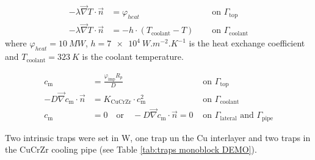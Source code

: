 \begin{subequations}
    \begin{align}
    -\lambda \vec{\nabla} T \cdot \vec{n} &=\varphi_{heat} \quad  &\text { on } \Gamma_\mathrm{top}\\
    -\lambda \vec{\nabla} T\cdot \vec{n} &= -h \cdot \left(T_\mathrm{coolant} - T\right)\quad &\text { on } \Gamma_\mathrm{coolant}
    \end{align}
    \label{eq: bc thermal DEMO monoblock}
\end{subequations}
where $\varphi_{heat}=\SI{10}{MW}$, $h=\SI{7e4}{W.m^{-2}.K^{-1}}$ is the heat exchange coefficient and $T_\mathrm{coolant} = \SI{323}{K}$ is the coolant temperature.

\begin{subequations}
    \begin{align}
    c_\mathrm{m} &=  \frac{\varphi_\mathrm{imp} R_p}{D} \quad &\text { on } \Gamma_\mathrm{top}\\
    -D \vec{\nabla} c_\mathrm{m} \cdot \vec{n} &= K_\mathrm{CuCrZr} \cdot c_\mathrm{m}^{2} \quad &\text { on } \Gamma_\mathrm{coolant} \\
    c_\mathrm{m} &=  0 \quad \text{or} \quad -D \vec{\nabla} c_\mathrm{m} \cdot \vec{n} = 0 &\text { on } \Gamma_\mathrm{lateral} \text{  and  } \Gamma_\mathrm{pipe}
    \end{align}
    \label{eq: bc H transport DEMO monoblock}
\end{subequations}

Two intrinsic traps were set in W, one trap un the Cu interlayer and two traps in the CuCrZr cooling pipe (see Table \ref{tab:traps monoblock DEMO}).

